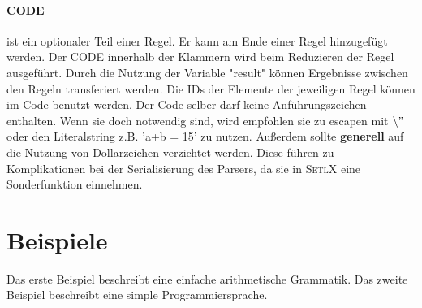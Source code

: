 \paragraph{CODE} ist ein optionaler Teil einer Regel. Er kann am Ende einer Regel hinzugefügt werden. Der CODE innerhalb der Klammern  wird beim Reduzieren der Regel ausgeführt. Durch die Nutzung der Variable "result" können Ergebnisse zwischen den Regeln transferiert werden. Die IDs der Elemente der jeweiligen Regel können im Code benutzt werden. Der Code selber darf keine Anführungszeichen enthalten. Wenn sie doch notwendig sind, wird empfohlen sie zu escapen mit $\backslash"$ oder den Literalstring z.B. 'a+b = 15' zu nutzen. Außerdem sollte \textbf{generell} auf die Nutzung von Dollarzeichen verzichtet werden. Diese führen zu Komplikationen bei der Serialisierung des Parsers, da sie in \textsc{SetlX} eine Sonderfunktion einnehmen. 
\newpage
\section{Beispiele}
Das erste Beispiel beschreibt eine einfache arithmetische Grammatik.
Das zweite Beispiel beschreibt eine simple Programmiersprache.
